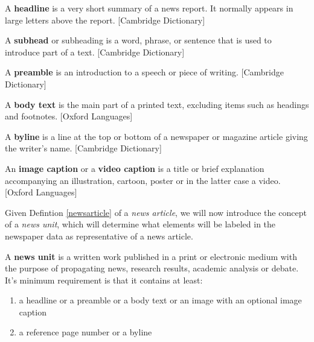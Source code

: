 \documentclass[english, bibtex]{kththesis}
\begin{document}
\begin{defn}
\label{headline}
A \textbf{headline} is a very short summary of a news report. It normally appears in large letters above the report. [Cambridge Dictionary]
\end{defn}

\begin{defn}
\label{subhead}
A \textbf{subhead} or subheading is a word, phrase, or sentence that is used to introduce part of a text. [Cambridge Dictionary]
\end{defn}

\begin{defn}
\label{preamble}
A \textbf{preamble} is an introduction to a speech or piece of writing. [Cambridge Dictionary]
\end{defn}

\begin{defn}
\label{body text}
A \textbf{body text} is the main part of a printed text, excluding items such as headings and footnotes. [Oxford Languages]
\end{defn}

\begin{defn}
\label{byline}
A \textbf{byline} is a line at the top or bottom of a newspaper or magazine article giving the writer's name. [Cambridge Dictionary]
\end{defn}

\begin{defn}
\label{img}
An \textbf{image caption} or a \textbf{video caption} is a title or brief explanation accompanying an illustration, cartoon, poster or in the latter case a video. [Oxford Languages]
\end{defn}

Given Defintion \ref{newsarticle} of a \textit{news article}, we will now introduce the concept of a \textit{news unit}, which will determine what elements will be labeled in the newspaper data as representative of a news article.

\begin{defn}
\label{newsunit}
A \textbf{news unit} is a written work published in a print or electronic medium with the purpose of propagating news, research results, academic analysis or debate. It’s minimum requirement is that it contains at least:

\begin{enumerate}
\item a headline or a preamble or a body text or an image with an optional image caption
\item a reference page number or a byline
\end{enumerate}
\end{defn}
\end{document}
